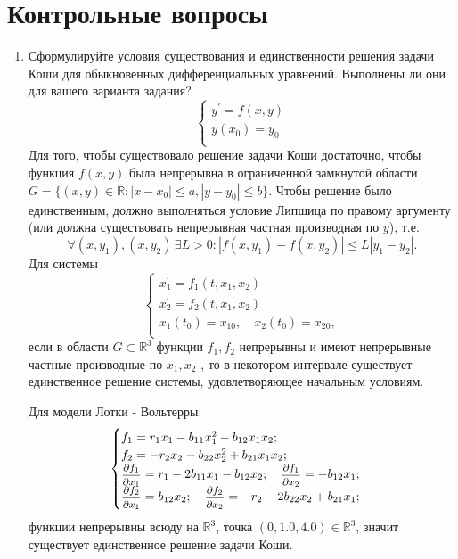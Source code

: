 \documentclass[12pt, a4paper]{article}
\begin{document}
\section{Контрольные вопросы}
\begin{enumerate}
\item Сформулируйте условия существования и единственности решения задачи Коши для обыкновенных дифференциальных уравнений. Выполнены ли они для вашего варианта задания?
\begin{equation*}
\begin{cases}
y^{'} = f(x,y)\\
y(x_0) = y_0\\
\end{cases}
\end{equation*}
Для того, чтобы существовало решение задачи Коши достаточно, чтобы функция $f(x,y)$ была непрерывна в ограниченной замкнутой области $G = \{(x,y) \in \mathbb{R}\colon |x - x_0|\leq a, |y - y_0|\leq b\}$. Чтобы решение было единственным, должно выполняться условие Липшица по правому аргументу (или должна существовать непрерывная частная производная по $y$), т.е.
\[
\forall (x,y_1), (x,y_2)\, \exists L>0 \colon |f(x,y_1) - f(x,y_2)|\leq L|y_1 - y_2|.
\] 
Для системы
\begin{equation*}
\begin{cases}
x_1^{'} = f_1(t,x_1,x_2)\\
x_2^{'} = f_2(t,x_1,x_2)\\
x_1(t_0) =x_{10},\quad x_2(t_0) = x_{20}, \\
\end{cases}
\end{equation*}
если в области $G \subset \mathbb{R}^3$ функции $f_1,f_2$  непрерывны и имеют непрерывные частные производные по $x_1, x_2$ , то в некотором интервале  существует единственное решение системы, удовлетворяющее начальным условиям.

Для модели Лотки - Вольтерры:
\begin{equation*}
\begin{cases}
f_1 =r_1x_1 - b_{11}x_1^2-b_{12}x_1x_2;\\
f_2 =-r_2x_2-b_{22}x_2^2+b_{21}x_1x_2;\\
\hbox{\footnotesize$\displaystyle\frac{\partial f_1}{\partial x_1}$} = r_1 - 2b_{11}x_1 - b_{12}x_2;\quad
\hbox{\footnotesize$\displaystyle\frac{\partial f_1}{\partial x_2}$} = -b_{12}x_1;\\
\hbox{\footnotesize$\displaystyle\frac{\partial f_2}{\partial x_1}$} =b_{12}x_2;\quad
\hbox{\footnotesize$\displaystyle\frac{\partial f_2}{\partial x_2}$} =-r_2 - 2b_{22}x_2 + b_{21}x_1;\\
\end{cases}
\end{equation*}
функции непрерывны всюду на $\mathbb{R}^3$, точка $(0, 1{.}0, 4{.}0) \in \mathbb{R}^3$, значит существует единственное решение задачи Коши.



\end{enumerate}
\end{document}
